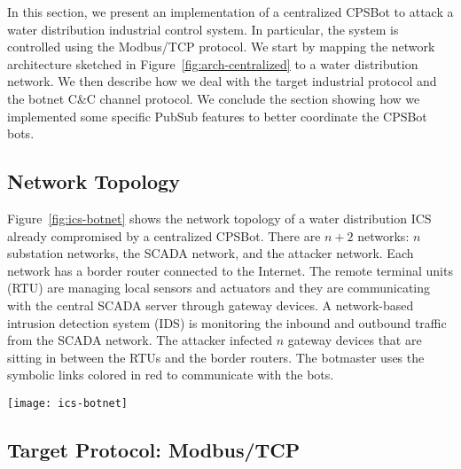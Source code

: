 \documentclass[sigconf]{acmart}
\makeatletter
\newcommand{\giuseppe}[1]{\textcolor{green}{Giuseppe: #1}}
\newcommand{\Botnet}{CPSBot\@\xspace}
\newcommand{\CC}{C\&C\@\xspace}
\makeatother
\begin{document}
In this section, we present an implementation of a centralized \Botnet
to attack a water distribution industrial control system.  In
particular, the system is controlled using the Modbus/TCP protocol. We start by
mapping the network architecture sketched in
Figure~\ref{fig:arch-centralized} to a water distribution
network. We then describe how we deal with the target industrial
protocol and the botnet \CC channel protocol. We conclude the section
showing how we implemented some specific PubSub features to better
coordinate the \Botnet bots.

\subsection{Network Topology}
\label{sec:dei-network}

Figure~\ref{fig:ics-botnet} shows the network topology of a water distribution
ICS already compromised by a centralized \Botnet. There are $n+2$ networks:
$n$ substation networks, the SCADA network, and the attacker network.
Each network has a border router connected to the Internet. The remote
terminal units (RTU) are managing local sensors and actuators and they are
communicating with the central SCADA server through gateway devices. A
network-based intrusion detection system (IDS) is monitoring the inbound and
outbound traffic from the SCADA network.
The attacker infected $n$ gateway devices that are sitting in between
the RTUs and the border routers. The botmaster uses the symbolic
links colored in red to communicate with the bots.

\begin{figure*}[tb]
    \centering
    \texttt{[image: ics-botnet]}
    \caption{Centralized \Botnet attacking a water distribution ICS. There are $n$
    substations. Each substation has a remote terminal unit (RTU), and a
    compromised gateway device (Bot). The SCADA server is in the
    central control network. The attacker (via the \CC) coordinates the bots
    from a remote location using the red links.}
    \label{fig:ics-botnet}
\end{figure*}


\subsection{Target Protocol: Modbus/TCP}
\label{sec:modbus}
\end{document}
